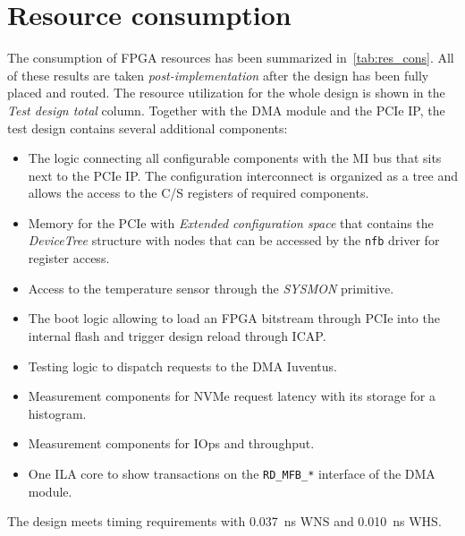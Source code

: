 \section{Resource consumption}

The consumption of FPGA resources has been summarized in~\cref{tab:res_cons}. All of these results
are taken \emph{post-implementation} after the design has been fully placed and routed. The
resource utilization for the whole design is shown in the \emph{Test design total} column. Together with
the DMA module and the PCIe IP, the test design contains several additional components:

\begin{itemize}
    \item The logic connecting all configurable components with the \ac{MI} bus that sits next to
    the PCIe IP. The configuration interconnect is organized as a tree and allows the access to the
    \ac{C/S} registers of required components.
    \item Memory for the PCIe with \emph{Extended configuration space} that contains the
    \emph{DeviceTree}\cite{devicetree} structure with nodes that can be accessed by the \verb|nfb|
    driver for register access.
    \item Access to the temperature sensor through the \emph{SYSMON} primitive\cite{amd_sysmon}.
    \item The boot logic allowing to load an FPGA bitstream through PCIe into the internal flash and
    trigger design reload through \ac{ICAP}\cite{amd_icap}.
    \item Testing logic to dispatch requests to the DMA Iuventus.
    \item Measurement components for NVMe request latency with its storage for a histogram.
    \item Measurement components for IOps and throughput.
    \item One \ac{ILA} core\cite{amd_ila} to show transactions on the \verb|RD_MFB_*| interface of
    the DMA module.
\end{itemize}

The design meets timing requirements with 0.037~ns WNS and 0.010~ns WHS.

